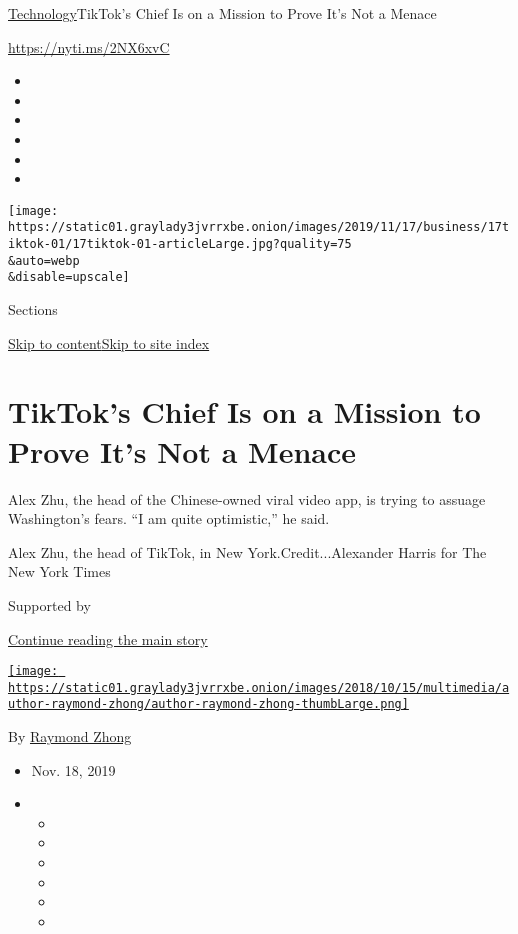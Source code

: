 \href{/section/technology}{Technology}\textbar{}TikTok's Chief Is on a
Mission to Prove It's Not a Menace

\href{https://nyti.ms/2NX6xvC}{https://nyti.ms/2NX6xvC}

\begin{itemize}
\item
\item
\item
\item
\item
\item
\end{itemize}

\texttt{[image: https://static01.graylady3jvrrxbe.onion/images/2019/11/17/business/17tiktok-01/17tiktok-01-articleLarge.jpg?quality=75\\\&auto=webp\\\&disable=upscale]}

Sections

\protect\hyperlink{site-content}{Skip to
content}\protect\hyperlink{site-index}{Skip to site index}

\hypertarget{tiktoks-chief-is-on-a-mission-to-prove-its-not-a-menace}{%
\section{TikTok's Chief Is on a Mission to Prove It's Not a
Menace}\label{tiktoks-chief-is-on-a-mission-to-prove-its-not-a-menace}}

Alex Zhu, the head of the Chinese-owned viral video app, is trying to
assuage Washington's fears. ``I am quite optimistic,'' he said.

Alex Zhu, the head of TikTok, in New York.Credit...Alexander Harris for
The New York Times

Supported by

\protect\hyperlink{after-sponsor}{Continue reading the main story}

\href{https://www.nytimes3xbfgragh.onion/by/raymond-zhong}{\texttt{[image: https://static01.graylady3jvrrxbe.onion/images/2018/10/15/multimedia/author-raymond-zhong/author-raymond-zhong-thumbLarge.png]}}

By \href{https://www.nytimes3xbfgragh.onion/by/raymond-zhong}{Raymond
Zhong}

\begin{itemize}
\item
  Nov. 18, 2019
\item
  \begin{itemize}
  \item
  \item
  \item
  \item
  \item
  \item
  \end{itemize}
\end{itemize}


